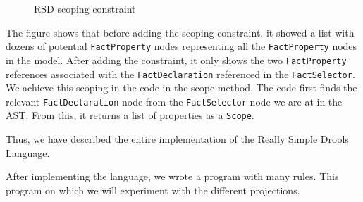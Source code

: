 \begin{figure}[htbp]
    \centering
    \caption{RSD scoping constraint}
    \label{fig:RSDConstraint}
\end{figure}

The figure shows that before adding the scoping constraint, it showed a list with dozens of potential \linebreak\texttt{FactProperty} nodes representing all the \texttt{FactProperty} nodes in the model.
After adding the constraint, it only shows the two \texttt{FactProperty} references associated with the \texttt{FactDeclaration} referenced in the \texttt{FactSelector}.
We achieve this scoping in the code in the scope method.
The code first finds the relevant \texttt{FactDeclaration} node from the \texttt{FactSelector} node we are at in the AST.
From this, it returns a list of properties as a \texttt{Scope}.

Thus, we have described the entire implementation of the Really Simple Drools Language.

After implementing the language, we wrote a program with many rules.
This program on which we will experiment with the different projections.

